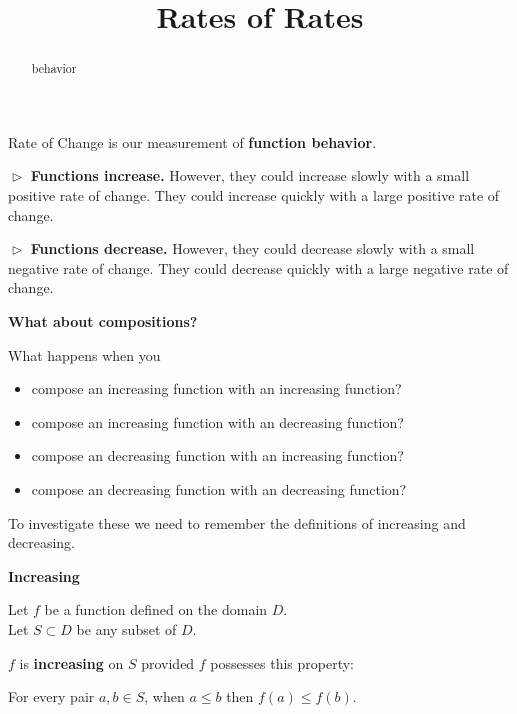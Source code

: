 \documentclass{ximera}
\title{Rates of Rates}
\begin{document}
\begin{abstract}
behavior
\end{abstract}
\maketitle




Rate of Change is our measurement of \textbf{function behavior}.




$\vartriangleright$  \textbf{\textcolor{blue!55!black}{Functions increase.}}  However, they could increase slowly with a small positive rate of change.  They could increase quickly with a large positive rate of change. 



$\vartriangleright$  \textbf{\textcolor{blue!55!black}{Functions decrease.}}  However, they could decrease slowly with a small negative rate of change.  They could decrease quickly with a large negative rate of change. 





\textbf{\textcolor{purple!85!blue}{What about compositions?}}





What happens when you


\begin{itemize}
\item compose an increasing function with an increasing function?
\item compose an increasing function with an decreasing function?
\item compose an decreasing function with an increasing function?
\item compose an decreasing function with an decreasing function?
\end{itemize}



To investigate these we need to remember the definitions of increasing and decreasing.






\begin{summary} \textbf{\textcolor{green!50!black}{Increasing}} 


Let $f$ be a function defined on the domain $D$. \\
Let $S \subset D$ be any subset of $D$.

$f$ is \textbf{increasing} on $S$ provided $f$ possesses this property:  


\begin{center}
For every pair $a, b \in S$, when $a \leq b$ then $f(a) \leq f(b)$.
\end{center}

\end{summary}
\end{document}
